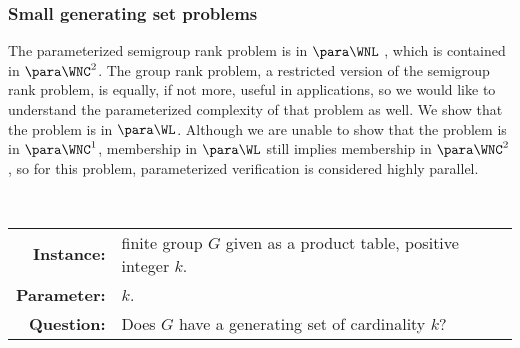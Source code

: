 \subsubsection{Small generating set problems}

%
%
%
The parameterized semigroup rank problem is in $\para \WNL$ \autocite[Theorem~3.12]{est15}, which is contained in $\para \WNC^2$.
%
%
%
The group rank problem, a restricted version of the semigroup rank problem, is equally, if not more, useful in applications, so we would like to understand the parameterized complexity of that problem as well.
%
%
%
We show that the problem is in $\para \WL$.
%
%
%
%
%
%
%
%
%
%
Although we are unable to show that the problem is in $\para \WNC^1$, membership in $\para \WL$ still implies membership in $\para \WNC^2$, so for this problem, parameterized verification is considered highly parallel.
%
%


\begin{definition}[$\pgrouprank$]
  \mbox{} \\
  \begin{tabular}{r p{9.2cm}}
    \textbf{Instance:} & finite group $G$ given as a product table, positive integer $k$. \\
    \textbf{Parameter:} & $k$. \\
    \textbf{Question:} & Does $G$ have a generating set of cardinality $k$?
  \end{tabular}
\end{definition}


